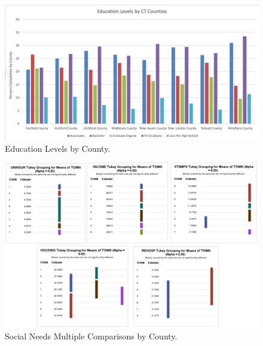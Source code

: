 \documentclass[12pt]{article}
\begin{document}
\begin{figure}[tbp]
  \label{fig:Education by County Graph}
    \centering
    \includegraphics[width=\textwidth]{Education Levels by County.pdf}
    \caption{Education Levels by County.}
  \end{figure}


\begin{figure}[tbp]
  \label{fig:Social Needs by County Graph}
    \centering
    \includegraphics[width=\textwidth]{Multiple Comparisons by County.pdf}
    \caption{Social Needs Multiple Comparisons by County.}
  \end{figure}
\end{document}
